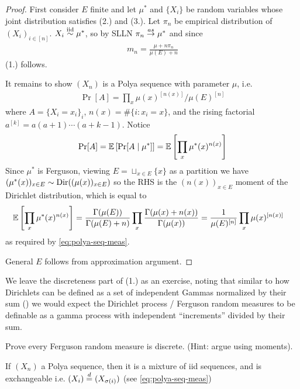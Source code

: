 \begin{proof}
  First consider $E$ finite and let $\mu^*$ and $\{X_i\}$
  be random variables whose joint distribution satisfies (2.)
  and (3.).
  Let $\pi_n$ be empirical distribution of $(X_i)_{i \in [n]}$.
  $X_i \overset{\text{iid}}{\sim} \mu^*$, so by SLLN $\pi_n \overset{as}{\to} \mu^*$ and since
  \begin{align}
    m_n = \frac{\mu + n \pi_n}{\mu(E) + n}
  \end{align}
  (1.) follows.

  It remains to show $(X_n)$ is a Polya sequence with parameter $\mu$, i.e.
  \begin{align}
    \label{eq:polya-seq-meas}
    \Pr[A] = \prod_x \mu(x)^{[n(x)]} / \mu(E)^{[n]}
  \end{align}
  where $A = \{X_i = x_i\}_{i}$, $n(x) = \#\{i : x_i = x\}$,
  and the rising factorial $a^{[k]} = a (a+1) \cdots (a+k-1)$.
  Notice
  \begin{align}
    \Pr[A]
    = \mathbb{E}\left[
      \Pr[A \mid \mu^*]
    \right]
    = \mathbb{E}\left[
      \prod_x \mu^*(x)^{n(x)}
    \right]
  \end{align}
  Since $\mu^*$ is Ferguson, viewing $E = \sqcup_{x \in E} \{x\}$
  as a partition we have
  $(\mu^*(x))_{x \in E} \sim \mathrm{Dir}((\mu(x))_{x \in E})$
  so the RHS is the $(n(x))_{x \in E}$ moment of the Dirichlet distribution,
  which is equal to
  \begin{align}
    \mathbb{E}\left[
      \prod_x \mu^*(x)^{n(x)}
    \right]
    &= \frac{\Gamma(\mu(E))}{\Gamma(\mu(E) + n)}
    \prod_{x} \frac{\Gamma(\mu(x) + n(x))}{\Gamma(\mu(x))}
    = \frac{1}{\mu(E)^{[n]}} \prod_x \mu(x)^{[n(x)]}
  \end{align}
  as required by \cref{eq:polya-seq-meas}.

  General $E$ follows from approximation argument.
\end{proof}

We leave the discreteness part of (1.) as an exercise, noting that
similar to how Dirichlets can be defined as a set of independent
Gammas normalized by their sum ()
we would expect the Dirichlet process / Ferguson random measures
to be definable as a gamma process with independent ``increments''
divided by their sum.

\begin{exercise}
  Prove every Ferguson random measure is discrete.
  (Hint: argue using moments).
\end{exercise}


\begin{remark}
  If $(X_n)$ a Polya sequence, then it
  is a mixture of iid sequences, and is exchangeable i.e.
  $(X_i) \overset{d}{=} (X_{\sigma(i)})$ (see \cref{eq:polya-seq-meas})
\end{remark}

